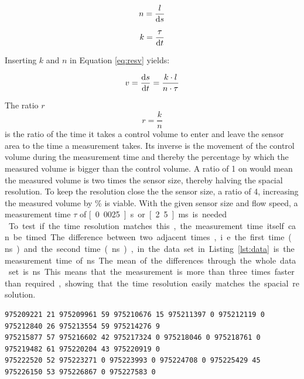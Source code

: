 \begin{equation}
	n = \dfrac{l}{\mathop{}\!\mathrm{d} s}
\label{eq:resn} 
\end{equation}

\begin{equation}
	k = \dfrac{ \tau}{\mathop{}\!\mathrm{d} t}
\label{eq:resk}
\end{equation}

Inserting $ k $ and $ n $ in Equation \eqref{eq:resv} yields:

\begin{equation}
	v = \dfrac{\mathop{}\!\mathrm{d} s}{\mathop{}\!\mathrm{d} t} = \dfrac{k \cdot l}{n \cdot \tau}
\label{eq:resv1} 
\end{equation}

The ratio $ r $
\begin{equation}
	r = \frac{k}{n}
\label{eq:resr} 
\end{equation}
is the ratio of the time it takes a control volume to enter and leave the sensor area  to the time a measurement takes. Its inverse is the movement of the control volume during the measurement time and thereby the percentage by which the measured volume is bigger than the control volume. A ratio of 1 on would mean the measured volume is two times the sensor size, thereby halving the spacial resolution. To keep the resolution close the the sensor size, a ratio of 4, increasing the measured volume by \unit[25]{\%} is viable.
With the given sensor size and flow speed, a measurement time $ \tau $ of \unit[0.0025]{s} or \unit[2.5]{ms} is needed.\\

To test if the time resolution matches this, the measurement time itself can be timed. The difference between two adjacent times, i.e. the first time (\unit[975209221]{ns}) and the second time (\unit[975209961]{ns}), in the data set in Listing \ref{lst:data} is the measurement time of \unit[740]{ns}. The mean of the differences through the whole data set is \unit[748]{ns}. This means that the measurement is more than three times faster than required, showing that the time resolution easily matches the spacial resolution.

\begin{lstlisting}[caption={An excerpt of measurement data showing three lines of data from eight sensors. The long numbers are the times at which the measurements were taken in nanoseconds measured from the start, the short numbers are the measured values.},label={lst:data}]
975209221 21 975209961 59 975210676 15 975211397 0 975212119 0 975212840 26 975213554 59 975214276 9 
975215877 57 975216602 42 975217324 0 975218046 0 975218761 0 975219482 61 975220204 43 975220919 0 
975222520 52 975223271 0 975223993 0 975224708 0 975225429 45 975226150 53 975226867 0 975227583 0  
\end{lstlisting}

